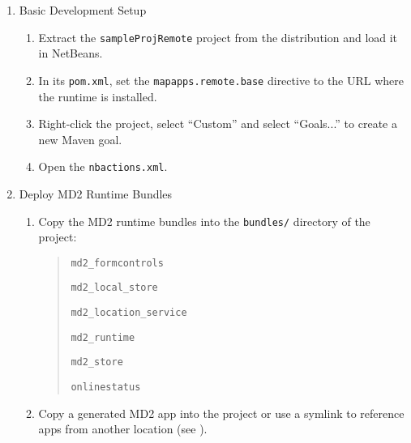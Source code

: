 \begin{enumerate}
\item {Basic \mapapps Development Setup} \label{subsec:basic-setup}

\begin{enumerate}
\item Extract the \lstinline|sampleProjRemote| project from the \mapapps distribution and load it in NetBeans. \label{item:extraction}
\item In its \lstinline|pom.xml|,
 set the \lstinline|mapapps.remote.base| directive to the URL where the \mapapps runtime is installed.
\item Right-click the project, select \enquote{Custom} and select \enquote{Goals...} to create a new Maven goal. 
\item Open the \lstinline|nbactions.xml|. 

\end{enumerate}

\item {Deploy MD2 Runtime Bundles}
\begin{enumerate}
\item Copy the MD2 runtime bundles into the \texttt{bundles/} directory of the project:
	\begin{quotation}
		 \texttt{md2\_formcontrols}
		 
		 \texttt{md2\_local\_store}
		 
		 \texttt{md2\_location\_service}
		 
		 \texttt{md2\_runtime}
		 
		 \texttt{md2\_store}
		 
		 \texttt{onlinestatus}
	\end{quotation}

\item Copy a generated MD2 app into the project or use a symlink to reference apps from another location (see ).
\end{enumerate}


\end{enumerate}